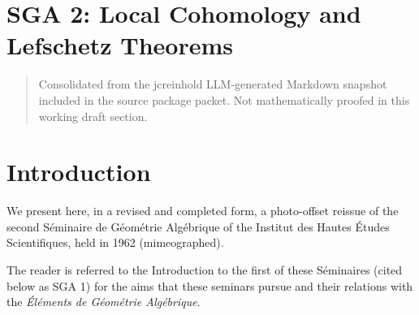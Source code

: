 \documentclass[
]{article}
\author{}
\date{}
\begin{document}
\section{SGA 2: Local Cohomology and Lefschetz
Theorems}\label{sga-2-local-cohomology-and-lefschetz-theorems}

\begin{quote}
Consolidated from the jcreinhold LLM-generated Markdown snapshot
included in the source package packet. Not mathematically proofed in this working draft section.
\end{quote}

\section{Introduction}\label{introduction}

We present here, in a revised and completed form, a photo-offset reissue
of the second Séminaire de Géométrie Algébrique of the Institut des
Hautes Études Scientifiques, held in 1962 (mimeographed).

The reader is referred to the Introduction to the first of these
Séminaires (cited below as SGA 1) for the aims that these seminars
pursue and their relations with the \emph{Éléments de Géométrie
Algébrique}.
\end{document}
